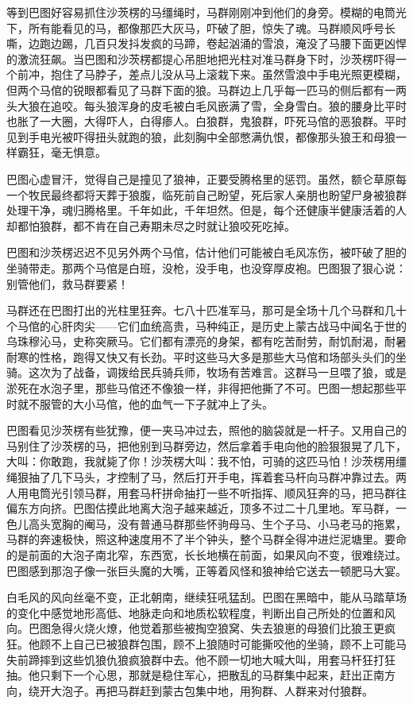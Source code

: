 \par 等到巴图好容易抓住沙茨楞的马缰绳时，马群刚刚冲到他们的身旁。模糊的电筒光下，所有能看见的马，都像那匹大灰马，吓破了胆，惊失了魂。马群顺风呼号长嘶，边跑边踢，几百只发抖发疯的马蹄，卷起汹涌的雪浪，淹没了马腰下面更凶悍的激流狂飙。当巴图和沙茨楞都提心吊胆地把光柱对准马群身下时，沙茨楞吓得一个前冲，抱住了马脖子，差点儿没从马上滚栽下来。虽然雪浪中手电光照更模糊，但两个马倌的锐眼都看见了马群下面的狼。马群边上几乎每一匹马的侧后都有一两头大狼在追咬。每头狼浑身的皮毛被白毛风嵌满了雪，全身雪白。狼的腰身比平时也胀了一大圈，大得吓人，白得瘆人。白狼群，鬼狼群，吓死马倌的恶狼群。平时见到手电光被吓得扭头就跑的狼，此刻胸中全部憋满仇恨，都像那头狼王和母狼一样霸狂，毫无惧意。
\par 巴图心虚冒汗，觉得自己是撞见了狼神，正要受腾格里的惩罚。虽然，额仑草原每一个牧民最终都将天葬于狼腹，临死前自己盼望，死后家人亲朋也盼望尸身被狼群处理干净，魂归腾格里。千年如此，千年坦然。但是，每个还健康半健康活着的人却都怕狼群，都不肯在自己寿期未尽之时就让狼咬死吃掉。
\par 巴图和沙茨楞迟迟不见另外两个马倌，估计他们可能被白毛风冻伤，被吓破了胆的坐骑带走。那两个马倌是白班，没枪，没手电，也没穿厚皮袍。巴图狠了狠心说：别管他们，救马群要紧！
\par 马群还在巴图打出的光柱里狂奔。七八十匹准军马，那可是全场十几个马群和几十个马倌的心肝肉尖——它们血统高贵，马种纯正，是历史上蒙古战马中闻名于世的乌珠穆沁马，史称突厥马。它们都有漂亮的身架，都有吃苦耐劳，耐饥耐渴，耐暑耐寒的性格，跑得又快又有长劲。平时这些马大多是那些大马倌和场部头头们的坐骑。这次为了战备，调拨给民兵骑兵师，牧场有苦难言。这群马一旦喂了狼，或是淤死在水泡子里，那些马倌还不像狼一样，非得把他撕了不可。巴图一想起那些平时就不服管的大小马倌，他的血气一下子就冲上了头。
\par 巴图看见沙茨楞有些犹豫，便一夹马冲过去，照他的脑袋就是一杆子。又用自己的马别住了沙茨楞的马，把他别到马群旁边，然后拿着手电向他的脸狠狠晃了几下，大叫：你敢跑，我就毙了你！沙茨楞大叫：我不怕，可骑的这匹马怕！沙茨楞用缰绳狠抽了几下马头，才控制了马，然后打开手电，挥着套马杆向马群冲靠过去。两人用电筒光引领马群，用套马杆拼命抽打一些不听指挥、顺风狂奔的马，把马群往偏东方向挤。巴图估摸此地离大泡子越来越近，顶多不过二十几里地。军马群，一色儿高头宽胸的阉马，没有普通马群那些怀驹母马、生个子马、小马老马的拖累，马群的奔速极快，照这种速度用不了半个钟头，整个马群全得冲进烂泥塘里。要命的是前面的大泡子南北窄，东西宽，长长地横在前面，如果风向不变，很难绕过。巴图感到那泡子像一张巨头魔的大嘴，正等着风怪和狼神给它送去一顿肥马大宴。
\par 白毛风的风向丝毫不变，正北朝南，继续狂吼猛刮。巴图在黑暗中，能从马踏草场的变化中感觉地形高低、地脉走向和地质松软程度，判断出自己所处的位置和风向。巴图急得火烧火燎，他觉着那些被掏空狼窝、失去狼崽的母狼们比狼王更疯狂。他顾不上自己已被狼群包围，顾不上狼随时可能撕咬他的坐骑，顾不上可能马失前蹄摔到这些饥狼仇狼疯狼群中去。他不顾一切地大喊大叫，用套马杆狂打狂抽。他只剩下一个心思，那就是稳住军心，把散乱的马群集中起来，赶出正南方向，绕开大泡子。再把马群赶到蒙古包集中地，用狗群、人群来对付狼群。
